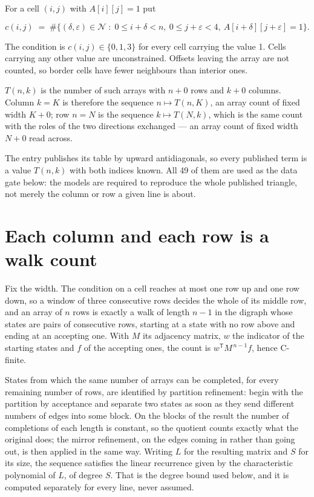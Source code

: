 \documentclass[11pt]{article}
\theoremstyle{definition}
\begin{document}
For a cell $(i,j)$ with $A[i][j] = 1$ put

\[c(i,j) \;=\; \#\bigl\{(\delta,\varepsilon)\in\mathcal{N} \;:\; 0\le i+\delta<n,\ 0\le j+\varepsilon<4,\ A[i+\delta][j+\varepsilon] = 1\bigr\}.\]

The condition is $c(i,j) \in \{0, 1, 3\}$ for every cell carrying the value 1. Cells carrying any other value are unconstrained. Offsets leaving the array are not counted, so border cells have fewer neighbours than interior ones.

$T(n,k)$ is the number of such arrays with $n + 0$ rows and $k + 0$ columns. Column $k = K$ is therefore the sequence $n \mapsto T(n,K)$, an array count of fixed width $K + 0$; row $n = N$ is the sequence $k \mapsto T(N,k)$, which is the same count with the roles of the two directions exchanged --- an array count of fixed width $N + 0$ read across.

The entry publishes its table by upward antidiagonals, so every published term is a value $T(n,k)$ with both indices known. All 49 of them are used as the data gate below: the models are required to reproduce the whole published triangle, not merely the column or row a given line is about.

\section{Each column and each row is a walk count}

Fix the width. The condition on a cell reaches at most one row up and one row down, so a window of three consecutive rows decides the whole of its middle row, and an array of $n$ rows is exactly a walk of length $n-1$ in the digraph whose states are pairs of consecutive rows, starting at a state with no row above and ending at an accepting one. With $M$ its adjacency matrix, $w$ the indicator of the starting states and $f$ of the accepting ones, the count is $w^{\mathsf T}M^{\,n-1}f$, hence C-finite.

States from which the same number of arrays can be completed, for every remaining number of rows, are identified by partition refinement: begin with the partition by acceptance and separate two states as soon as they send different numbers of edges into some block. On the blocks of the result the number of completions of each length is constant, so the quotient counts exactly what the original does; the mirror refinement, on the edges coming in rather than going out, is then applied in the same way. Writing $L$ for the resulting matrix and $S$ for its size, the sequence satisfies the linear recurrence given by the characteristic polynomial of $L$, of degree $S$. That is the degree bound used below, and it is computed separately for every line, never assumed.
\end{document}
